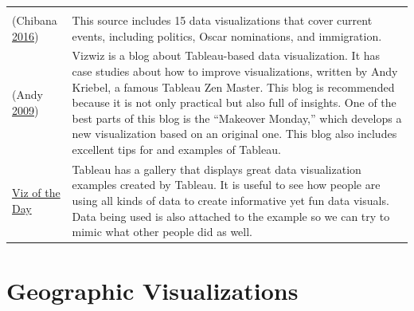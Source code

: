 \documentclass[]{book}
\begin{document}
\begin{longtable}[]{@{}ll@{}}
\begin{minipage}[t]{0.80\columnwidth}
\end{minipage}\tabularnewline
\begin{minipage}[t]{0.14\columnwidth}\raggedright
(Chibana \protect\hyperlink{ref-int_viz_current}{2016})\strut
\end{minipage} & \begin{minipage}[t]{0.80\columnwidth}\raggedright
This source includes 15 data visualizations that cover current events, including politics, Oscar nominations, and immigration.\strut
\end{minipage}\tabularnewline
\begin{minipage}[t]{0.14\columnwidth}\raggedright
(Andy \protect\hyperlink{ref-vizwiz}{2009})\strut
\end{minipage} & \begin{minipage}[t]{0.80\columnwidth}\raggedright
Vizwiz is a blog about Tableau-based data visualization. It has case studies about how to improve visualizations, written by Andy Kriebel, a famous Tableau Zen Master. This blog is recommended because it is not only practical but also full of insights. One of the best parts of this blog is the ``Makeover Monday,'' which develops a new visualization based on an original one. This blog also includes excellent tips for and examples of Tableau.\strut
\end{minipage}\tabularnewline
\begin{minipage}[t]{0.14\columnwidth}\raggedright
\href{https://public.tableau.com/en-us/s/gallery}{Viz of the Day}\strut
\end{minipage} & \begin{minipage}[t]{0.80\columnwidth}\raggedright
Tableau has a gallery that displays great data visualization examples created by Tableau. It is useful to see how people are using all kinds of data to create informative yet fun data visuals. Data being used is also attached to the example so we can try to mimic what other people did as well.\strut
\end{minipage}\tabularnewline
\bottomrule
\end{longtable}

\hypertarget{geographic-visualizations}{%
\section{Geographic Visualizations}\label{geographic-visualizations}}
\end{document}
